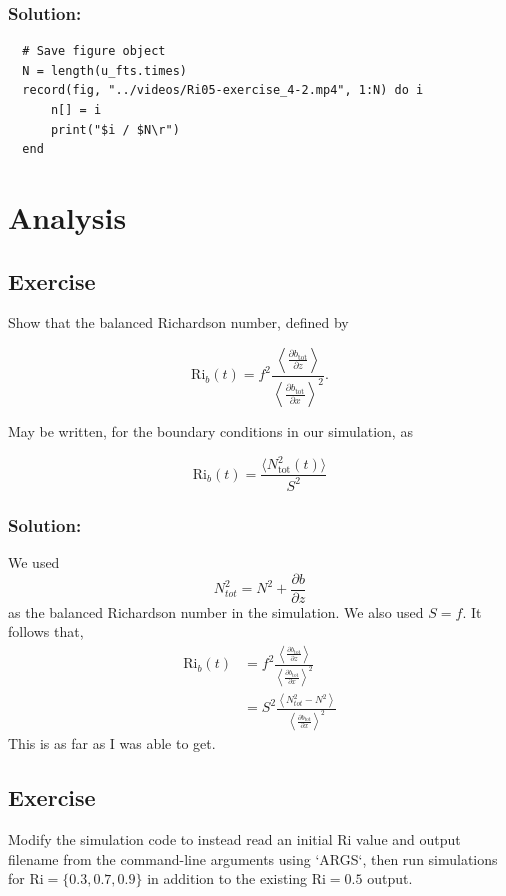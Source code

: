 \documentclass[12 pt]{article}
\numberwithin{equation}{section} %
\begin{document}
\subsubsection*{Solution:}
\begin{lstlisting}
  # Save figure object
  N = length(u_fts.times)
  record(fig, "../videos/Ri05-exercise_4-2.mp4", 1:N) do i
      n[] = i 
      print("$i / $N\r")
  end
\end{lstlisting}


\section{Analysis}

\subsection{Exercise}
Show that the balanced Richardson number, defined by

$$\text{Ri}_b(t) = f^2\frac{\left \langle \frac{\partial b_\text{tot}}{\partial z}\right\rangle}{ \left\langle \frac{\partial b_\text{tot}}{\partial x}\right\rangle^2}.$$

May be written, for the boundary conditions in our simulation, as

$$\text{Ri}_b(t) = \frac{\langle N^2_\text{tot}(t)\rangle}{S^2}$$


\subsubsection*{Solution:}  %
We used
\begin{equation*}
  N_{tot}^2 = N^2 + \frac{\partial b}{\partial z}
\end{equation*}
as the balanced Richardson number in the simulation. We also used $S=f$. It follows that,
\begin{align*}
  \text{Ri}_b(t) &= f^2\frac{\left \langle \frac{\partial b_\text{tot}}{\partial z}\right\rangle}{ \left\langle \frac{\partial b_\text{tot}}{\partial x}\right\rangle^2} \\
          &= S^2 \frac{\left \langle N_{tot}^2 - N^2 \right\rangle}{ \left\langle \frac{\partial b_\text{tot}}{\partial x}\right\rangle^2}
\end{align*}
This is as far as I was able to get.


\subsection{Exercise}
Modify the simulation code to instead read an initial $\text{Ri}$ value and output filename from the command-line arguments using `ARGS`, then run simulations for $\text{Ri} = \{0.3, 0.7, 0.9\}$ in addition to the existing $\text{Ri}=0.5$ output.
\end{document}
